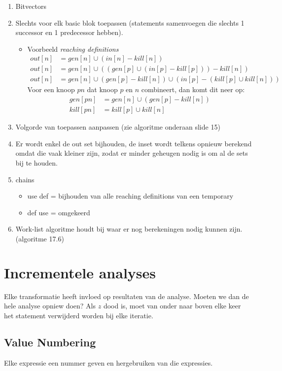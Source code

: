 \begin{enumerate}
	\item Bitvectors
	\item Slechts voor elk basic blok toepassen (statements samenvoegen die slechts 1 successor en 1 predecessor hebben). 
	\begin{itemize}
		\item Voorbeeld \textit{reaching definitions}
		\begin{align*}
			out[n] & = gen[n] \cup (in[n] - kill[n]) \\
			out[n] & = gen[n] \cup ((gen[p] \cup (in[p] - kill[p])) - kill[n]) \\
			out[n] & = gen[n] \cup (gen[p] - kill[n]) \cup (in[p] - (kill[p] \cup kill[n]))
		\end{align*}
		Voor een knoop $pn$ dat knoop $p$ en $n$ combineert, dan komt dit neer op:
		\begin{align*}
			gen[pn] &= gen[n] \cup (gen[p] - kill[n]) \\
			kill[pn] &= kill[p] \cup kill[n]
		\end{align*}
	\end{itemize}

	\item Volgorde van toepassen aanpassen (zie algoritme onderaan slide 15)
	\item Er wordt enkel de out set bijhouden, de inset wordt telkens opnieuw berekend omdat die vaak kleiner zijn, zodat er minder geheugen nodig is om al de sets bij te houden.
	\item chains 
	\begin{itemize}
		\item use def  = bijhouden van alle reaching definitions van een temporary
		\item def use = omgekeerd
	\end{itemize}
	\item Work-list algoritme houdt bij waar er nog berekeningen nodig kunnen zijn. (algoritme 17.6)
\end{enumerate}

\section{Incrementele analyses}
Elke transformatie heeft invloed op resultaten van de analyse. Moeten we dan de hele analyse opniew doen? Als $z$ dood is, moet van onder naar boven elke keer het statement verwijderd worden bij elke iteratie.

\subsection{Value Numbering}
Elke expressie een nummer geven en hergebruiken van die expressies.


